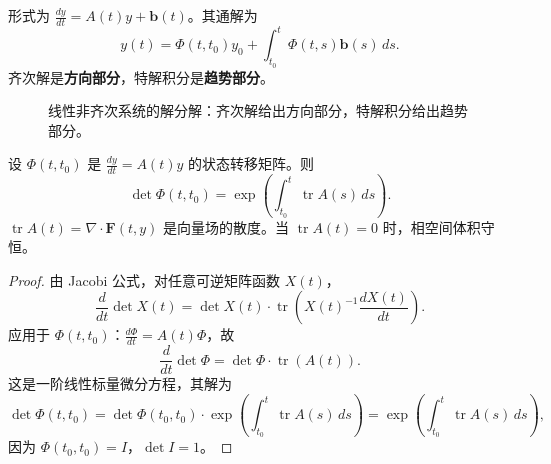 \begin{definition}[一阶线性非齐次系统]\label{def:linear_inhomogeneous_ode}
形式为 $\frac{dy}{dt} = A(t) y + \mathbf{b}(t)$。其通解为
\[
y(t) = \Phi(t, t_0) y_0 + \int_{t_0}^t \Phi(t, s) \mathbf{b}(s)\,ds.
\]
齐次解是\textbf{方向部分}，特解积分是\textbf{趋势部分}。
\end{definition}

\begin{figure}[htbp]
\centering
{}
\caption{线性非齐次系统的解分解：齐次解给出方向部分，特解积分给出趋势部分。}
\label{fig:linear_ode_decomposition}
\end{figure}

\begin{proposition}\label{prop:liouville_formula}
设 $\Phi(t, t_0)$ 是 $\frac{dy}{dt} = A(t) y$ 的状态转移矩阵。则
\[
\det \Phi(t, t_0) = \exp\left( \int_{t_0}^t \operatorname{tr} A(s) \, ds \right).
\]
$\operatorname{tr} A(t) = \nabla \cdot \mathbf{F}(t, y)$ 是向量场的散度。当 $\operatorname{tr} A(t) = 0$ 时，相空间体积守恒。
\end{proposition}

\begin{proof}
由 Jacobi 公式，对任意可逆矩阵函数 $X(t)$，
\[
\frac{d}{dt} \det X(t) = \det X(t) \cdot \operatorname{tr}\!\left( X(t)^{-1} \frac{dX(t)}{dt} \right).
\]
应用于 $\Phi(t, t_0)$：$\frac{d\Phi}{dt} = A(t)\Phi$，故
\[
\frac{d}{dt} \det \Phi = \det \Phi \cdot \operatorname{tr}(A(t)).
\]
这是一阶线性标量微分方程，其解为
\[
\det \Phi(t, t_0) = \det \Phi(t_0, t_0) \cdot \exp\left( \int_{t_0}^t \operatorname{tr}A(s)\,ds \right) = \exp\left( \int_{t_0}^t \operatorname{tr}A(s)\,ds \right),
\]
因为 $\Phi(t_0, t_0) = I$，$\det I = 1$。
\end{proof}

